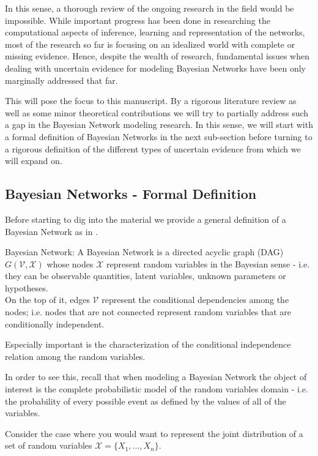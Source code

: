 \documentclass[11pt]{article}
\begin{document}
\begin{article}
In this sense, a thorough review of the ongoing research in the
field would be impossible. While important progress has been done
in researching the computational aspects of inference, learning and
representation of the networks, most of the research so far is
focusing on an idealized world with complete or missing
evidence. Hence, despite the wealth of research, fundamental issues
when dealing with uncertain evidence for modeling Bayesian Networks
have been only marginally addressed that far.

This will pose the focus to this manuscript. By a rigorous literature
review as well as some minor theoretical contributions we will try to
partially address such a gap in the Bayesian Network modeling
research. In this sense, we will start with a formal definition of
Bayesian Networks in the next sub-section before turning to a
rigorous definition of the different types of uncertain evidence
from which we will expand on.

\subsection{Bayesian Networks - Formal Definition}
\label{sec:orgfc4a855}
Before starting to dig into the material we provide a general
definition of a Bayesian Network as in \cite{pearl2011bayesian}.

\begin{definition}
Bayesian Network: A Bayesian Network is a directed acyclic graph (DAG) $G(\mathscr{V}, \mathscr{X})$
whose nodes $\mathscr{X}$ represent random variables in the Bayesian sense - i.e. they can be observable
quantities, latent variables, unknown parameters or hypotheses. \\
On the top of it, edges $\mathscr{V}$ represent the conditional dependencies among the nodes; i.e. nodes that
are not connected represent random variables that are conditionally independent.
\end{definition}

Especially important is the characterization of the conditional
independence relation among the random variables.

In order to see this, recall that when modeling a Bayesian Network
the object of interest is the complete probabilistic model of the
random variables domain - i.e. the probability of every possible
event as defined by the values of all of the variables.

Consider the case where you would want to represent the joint
distribution of a set of random variables \(\mathscr{X} = \{X_1, ...,
   X_n\}\).


\end{article}
\end{document}
